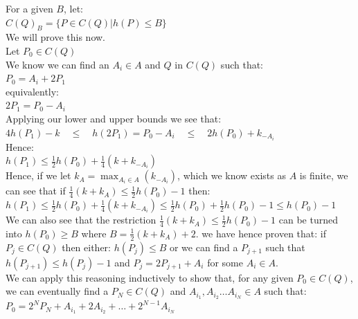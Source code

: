 \documentclass{article}
\begin{document}
For a given $B$, let:\\

$C(Q)_B = \{P \in C(Q) | h(P) \leq B\}$\\

We will prove this now.\\

Let $P_0 \in C(Q)$\\

We know we can find an $A_i \in A$ and $Q$ in $C(Q)$ such that:\\

$P_0 = A_i + 2P_1$\\

equivalently:\\

$2P_1 = P_0 - A_i$\\

Applying our lower and upper bounds we see that:\\

$4h(P_1) - k \quad \leq \quad  h(2P_1) =  P_0 - A_i  \quad  \leq  \quad  2h(P_0) + k_{-A_i} $\\

Hence:\\

$h(P_1) \leq \frac{1}{2}h(P_0) + \frac{1}{4} (k + k_{-A_i})$\\

Hence, if we let $k_A = \max_{A_i \in A}(k_{-A_i})$, which we know exists as $A$ is finite, we can see that if $\frac{1}{4}(k + k_A) \leq \frac{1}{2}h(P_0) - 1$ then:\\

$h(P_1) \leq \frac{1}{2}h(P_0) + \frac{1}{4} (k + k_{-A_i}) \leq \frac{1}{2}h(P_0) + \frac{1}{2}h(P_0) - 1 \leq h(P_0) - 1$\\

We can also see that the restriction $\frac{1}{4}(k + k_A) \leq \frac{1}{2}h(P_0) - 1$ can be turned into $h(P_0) \geq B$ where $B = \frac{1}{2}(k + k_A) + 2$. we have hence proven that: if $P_j \in C(Q)$ then either: $h(P_j) \leq B$ or we can find a $P_{j + 1}$ such that $h(P_{j + 1}) \leq h(P_j) - 1$ and $P_j = 2P_{j+1} + A_i$ for some $A_i \in A$.\\

We can apply this reasoning inductively to show that, for any given $P_0 \in C(Q)$, we can eventually find a $P_N \in C(Q)$ and $A_{i_1}, A_{i_2} \dots A_{i_N} \in A$ such that:\\

$P_0 = 2^N P_N + A_{i_1} + 2 A_{i_2} + \dots + 2^{N-1}A_{i_N}$\\
\end{document}
